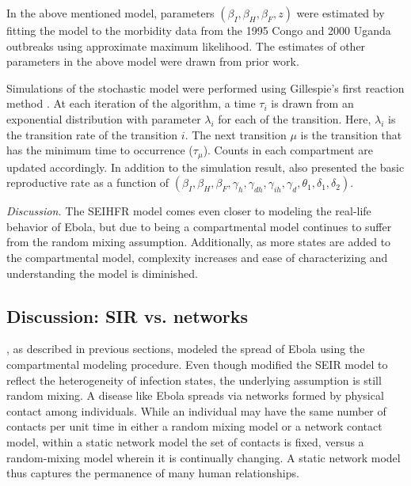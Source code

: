 \documentclass[10pt, journal,onecolumn]{IEEEtran}
\begin{document}
In the above mentioned model, parameters $(\beta_I, \beta_H, \beta_F , z)$ were estimated by fitting
the model to the morbidity data from the 1995 Congo and 2000 Uganda outbreaks using approximate maximum
likelihood. The estimates of other parameters in the above model were drawn from prior work.

Simulations of the stochastic model were performed using Gillespie's first reaction method \citep{gillespie1976general}. At each iteration of the algorithm, a time $\tau_i$ is drawn from an exponential distribution with parameter $\lambda_i$ for each of the transition. Here, $\lambda_i$ is the transition rate of the transition $i$. The next transition $\mu$ is the transition that has the minimum time to occurrence ($\tau_\mu$). Counts in each compartment are updated accordingly. In addition to the simulation result,  \citep{legrand2007understanding} also presented the basic reproductive rate as a function of $(\beta_I,\beta_H,\beta_F,\gamma_h,\gamma_{dh},\gamma_{ih},\gamma_d,\theta_1,\delta_1,\delta_2)$.

\textit{Discussion.} The SEIHFR model comes even closer to modeling the real-life behavior of Ebola,
but due to being a compartmental model continues to suffer from the random mixing assumption.
Additionally, as more states are added to the compartmental model, complexity increases and ease of
characterizing and understanding the model is diminished.

\subsection{\textbf{Discussion: SIR \citep{chowell2004basic, legrand2007understanding} vs. networks \citep{newman2002spread}}}

\citep{chowell2004basic, legrand2007understanding}, as described in previous sections, modeled the spread of Ebola using the
compartmental modeling procedure. Even though \citep{legrand2007understanding} modified the
SEIR model to reflect the heterogeneity of infection states, the underlying assumption is still
random mixing. A disease like Ebola spreads via networks formed by physical contact among individuals.
While an individual may have the same number of contacts per unit
time in either a random mixing model or a network contact model, within a static network model the set of
contacts is fixed, versus a random-mixing model wherein it is continually changing.
A static network model thus captures the permanence of many human relationships.
\end{document}
